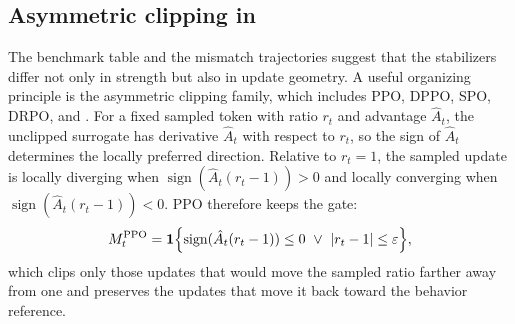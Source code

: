 \subsection{Asymmetric clipping in \satr{}}
\label{sec:exp-asymclip}

The benchmark table and the mismatch trajectories suggest that the stabilizers differ not only in strength but also in update geometry. A useful organizing principle is the asymmetric clipping family, which includes PPO, DPPO, SPO, DRPO, and \satr{}. For a fixed sampled token with ratio $r_t$ and advantage $\hat A_t$, the unclipped surrogate has derivative $\hat A_t$ with respect to $r_t$, so the sign of $\hat A_t$ determines the locally preferred direction. Relative to $r_t=1$, the sampled update is locally diverging when $\operatorname{sign}(\hat A_t(r_t-1))>0$ and locally converging when $\operatorname{sign}(\hat A_t(r_t-1))<0$. PPO therefore keeps the gate:
\begin{equation}
M_t^{\mathrm{PPO}}
=\mathbf 1\Bigl\{\operatorname{sign}(\hat A_t(r_t-1))\le 0\ \vee\ |r_t-1|\le\varepsilon\Bigr\},
\label{eq:exp-asym-ppo-mask}
\end{equation}
which clips only those updates that would move the sampled ratio farther away from one and preserves the updates that move it back toward the behavior reference.


